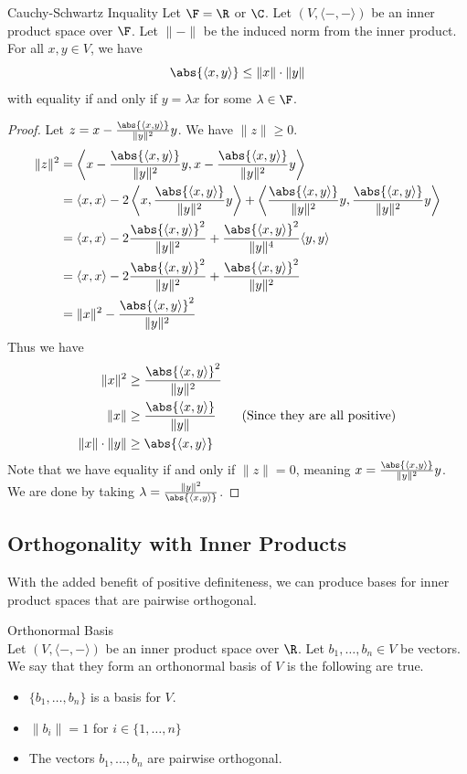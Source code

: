 \documentclass[a4paper]{article}
\begin{document}
\begin{prp}{Cauchy-Schwartz Inquality}{} Let $\F=\R$ or $\C$. Let $(V,\langle-,-\rangle)$ be an inner product space over $\F$. Let $\|-\|$ be the induced norm from the inner product. For all $x,y\in V$, we have $$\abs{\langle x,y\rangle}\leq\|x\|\cdot\|y\|$$ with equality if and only if $y=\lambda x$ for some $\lambda\in\F$. 
\begin{proof} Let $z=x-\frac{\abs{\langle x,y\rangle}}{\|y\|^2}y$. We have $\|z\|\geq0$. 
\begin{align*}
\|z\|^2&=\left\langle x-\frac{\abs{\langle x,y\rangle}}{\|y\|^2}y,x-\frac{\abs{\langle x,y\rangle}}{\|y\|^2}y\right\rangle\\
&=\langle x,x\rangle-2\left\langle x,\frac{\abs{\langle x,y\rangle}}{\|y\|^2}y\right\rangle+\left\langle \frac{\abs{\langle x,y\rangle}}{\|y\|^2}y,\frac{\abs{\langle x,y\rangle}}{\|y\|^2}y\right\rangle\\
&=\langle x,x\rangle-2\frac{\abs{\langle x,y\rangle}^2}{\|y\|^2}+\frac{\abs{\langle x,y\rangle}^2}{\|y\|^4}\langle y,y\rangle\\
&=\langle x,x\rangle-2\frac{\abs{\langle x,y\rangle}^2}{\|y\|^2}+\frac{\abs{\langle x,y\rangle}^2}{\|y\|^2}\\
&=\|x\|^2-\frac{\abs{\langle x,y\rangle}^2}{\|y\|^2}\\
\end{align*}
Thus we have
\begin{align*}
\|x\|^2&\geq\frac{\abs{\langle x,y\rangle}^2}{\|y\|^2}\\
\|x\|&\geq\frac{\abs{\langle x,y\rangle}}{\|y\|}\tag{Since they are all positive}\\
\|x\|\cdot\|y\|&\geq\abs{\langle x,y\rangle}
\end{align*}
Note that we have equality if and only if $\|z\|=0$, meaning $x=\frac{\abs{\langle x,y\rangle}}{\|y\|^2}y$. We are done by taking $\lambda=\frac{\|y\|^2}{\abs{\langle x,y\rangle}}$. 
\end{proof}
\end{prp}

\subsection{Orthogonality with Inner Products}
With the added benefit of positive definiteness, we can produce bases for inner product spaces that are pairwise orthogonal. 

\begin{defn}{Orthonormal Basis}{}\\
Let $(V,\langle-,-\rangle)$ be an inner product space over $\R$. Let $b_1,\dots,b_n\in V$ be vectors. We say that they form an orthonormal basis of $V$ is the following are true. 
\begin{itemize}
\item $\{b_1,\dots,b_n\}$ is a basis for $V$. 
\item $\|b_i\|=1$ for $i\in\{1,\dots,n\}$
\item The vectors $b_1,\dots,b_n$ are pairwise orthogonal. 
\end{itemize}
\end{defn}
\end{document}
